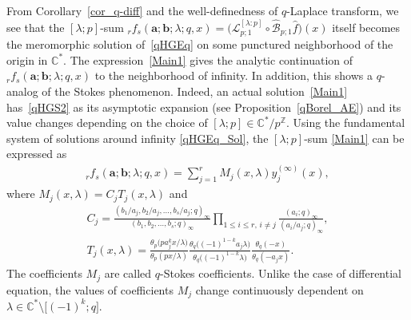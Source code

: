 From Corollary~\ref{cor_q-diff} and the well-definedness of $q$-Laplace transform, we see that the $[\lambda;p]$-sum ${}_rf_s(\bm{a};\bm{b};\lambda;q,x)=\big(\mathcal{L}_{p;1}^{[\lambda:p]}\circ\mathcal{\hat{B}}_{p;1}\hat{f}\big)(x)$ itself becomes the meromorphic solution of~\eqref{qHGEq} on some punctured neighborhood of the origin in $\mathbb{C}^*$. The expression~\eqref{Main1} gives the analytic continuation of ${}_rf_s(\bm{a};\bm{b};\lambda;q,x)$ to the neighborhood of infinity.
 In addition, this shows a $q$-analog of the Stokes phenomenon. Indeed, an actual solution~\eqref{Main1} has~\eqref{qHGS2} as its asymptotic expansion (see Proposition~\ref{qBorel_AE}) and its value changes depending on the choice of $[\lambda;p]\in\mathbb{C}^*/p^{\mathbb{Z}}$.
Using the fundamental system of solutions around infinity \eqref{qHGEq_Sol}, the $[\lambda;p]$-sum \eqref{Main1} can be expressed as
\begin{gather*}
{}_rf_s(\bm{a};\bm{b};\lambda;q,x)=\sum_{j=1}^r M_j(x,\lambda)y_j^{(\infty)}(x),
\end{gather*}
where $M_j(x,\lambda)=C_jT_j(x,\lambda)$ and
\begin{gather*}
C_j=\frac{(b_1/a_j,b_2/a_j,\ldots,b_s/a_j;q)_\infty}{(b_1,b_2,\ldots,b_s;q)_\infty}\prod_{1\le i\le r,\, i\neq j}\frac{(a_i;q)_\infty}{(a_i/a_j;q)_\infty},\\
T_j(x,\lambda)=\frac{\theta_{p}\big(pa_j^kx/\lambda\big)}{\theta_{p}(px/\lambda)}\frac{\theta_q\big((-1)^{1-k}a_j\lambda\big)}{\theta_q\big((-1)^{1-k}\lambda\big)}\frac{\theta_q(-x)}{\theta_q(-a_jx)}\label{T_j}.
\end{gather*}
The coefficients $M_j$ are called $q$-Stokes coefficients. Unlike the case of differential equation, the values of coefficients $M_j$ change continuously dependent on $\lambda\in\mathbb{C}^*\setminus\big[(-1)^k;q\big]$.
